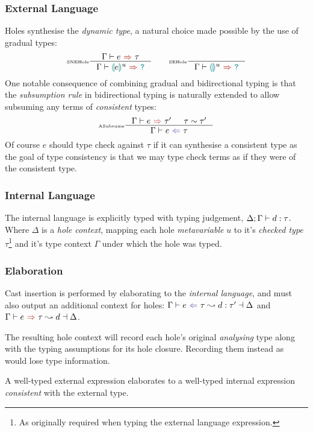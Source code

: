 \subsubsection{External Language}\label{sec:HazelExternalLang}
Holes synthesise the \textit{dynamic type}, a natural choice made possible by the use of gradual types:
\[\inference[\tiny SNEHole]{\synthesis{e}{\tau}}{\synthesis{\hole[e]^u}{\dyn}} \qquad \inference[\tiny SEHole]{}{\synthesis{\hole^u}{\dyn}}\] 
One notable consequence of combining gradual and bidirectional typing is that the \textit{subsumption rule} in bidirectional typing is naturally extended to allow subsuming any terms of \textit{consistent} types:
\[\inference[\tiny ASubsume]{\synthesis{e}{\tau'}& \tau \sim \tau'}{\analysis{e}{\tau}}\]
Of course $e$ should type check against $\tau$ if it can synthesise a consistent type as the goal of type consistency is that we may type check terms as if they were of the consistent type.

\subsubsection{Internal Language}\label{sec:HazelInternalLang}
The internal language is explicitly typed with typing judgement, $\Delta;\Gamma \vdash d : \tau$. Where $\Delta$ is a \textit{hole context}, mapping each hole \textit{metavariable} $u$ to it's \textit{checked type} $\tau$\footnote{As originally required when typing the external language expression.} and it's type context $\Gamma$ under which the hole was typed.

\subsubsection{Elaboration}\label{sec:HazelElaboration}
Cast insertion is performed by elaborating to the \textit{internal language}, and must also output an additional context for holes: $\elaborationAnalysis{e}{\tau}{d}{\tau'}{\Delta}$ and $\elaborationSynthesis{e}{\tau}{d}{\Delta}$.

The resulting hole context will record each hole's original \textit{analysing} type along with the typing assumptions for its hole closure. Recording them instead as {\dyn} would lose type information.

A well-typed external expression elaborates to a well-typed internal expression \textit{consistent} with the external type.

